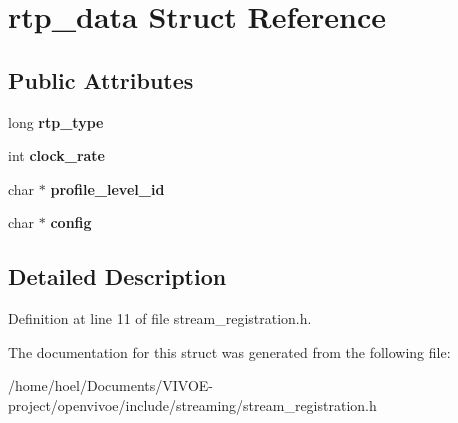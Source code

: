 \hypertarget{structrtp__data}{}\section{rtp\+\_\+data Struct Reference}
\label{structrtp__data}
\subsection*{Public Attributes}
\begin{DoxyCompactItemize}
\item 
long {\bfseries rtp\+\_\+type}\hypertarget{structrtp__data_a70d3aec5179ccfa2fcb8360aba9771a5}{}\label{structrtp__data_a70d3aec5179ccfa2fcb8360aba9771a5}

\item 
int {\bfseries clock\+\_\+rate}\hypertarget{structrtp__data_a0f054af8960eb80cb7c55331cc47162d}{}\label{structrtp__data_a0f054af8960eb80cb7c55331cc47162d}

\item 
char $\ast$ {\bfseries profile\+\_\+level\+\_\+id}\hypertarget{structrtp__data_a37d0c0f2e7318cf5c251c09f69bc98b8}{}\label{structrtp__data_a37d0c0f2e7318cf5c251c09f69bc98b8}

\item 
char $\ast$ {\bfseries config}\hypertarget{structrtp__data_a5591677d4fb8c51af1ef09bf026f9ab9}{}\label{structrtp__data_a5591677d4fb8c51af1ef09bf026f9ab9}

\end{DoxyCompactItemize}


\subsection{Detailed Description}


Definition at line 11 of file stream\+\_\+registration.\+h.



The documentation for this struct was generated from the following file\+:\begin{DoxyCompactItemize}
\item 
/home/hoel/\+Documents/\+V\+I\+V\+O\+E-\/project/openvivoe/include/streaming/stream\+\_\+registration.\+h\end{DoxyCompactItemize}
